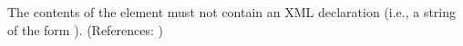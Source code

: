 The contents of the  element must not contain an XML
declaration (i.e., a string of the form ).  (References: )
